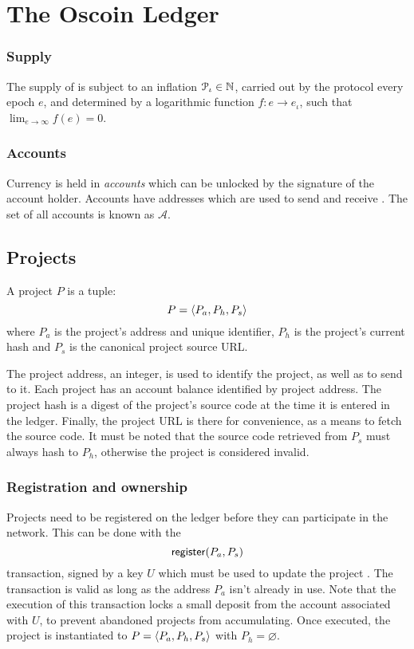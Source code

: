 \section{The Oscoin Ledger}
\label{s:ledger}

\subsubsection{Supply}

The supply of \oscoin{} is subject to an inflation $\mathcal{P}_{\iota} \in
\mathbb{N}$, carried out by the protocol every epoch $e$, and determined by a
logarithmic function $f : e \to e_{\iota}$, such that $\lim_{e \to \infty} f(e)
= 0$.

\subsubsection{Accounts}
\label{s:accounts}

Currency is held in \emph{accounts} which can be unlocked by the signature of
the account holder. Accounts have addresses which are used to send and receive
\oscoin{}. The set of all accounts is known as $\mathcal{A}$.

\subsection{Projects}
\label{s:projects}

A project $P$ is a tuple:
\[
    P = \langle P_a, P_h, P_s\rangle
\]
where $P_{a}$ is the project's address and unique identifier, $P_h$ is
the project's current hash and $P_s$ is the canonical project source
URL.

The project address, an integer, is used to identify the project, as
well as to send \oscoin{} to it. Each project has an account balance
identified by project address. The project hash is a digest of the
project's source code at the time it is entered in the
ledger. Finally, the project URL is there for convenience, as a means
to fetch the source code.  It must be noted that the source code
retrieved from $P_s$ must always hash to $P_h$, otherwise the project
is considered invalid.

\subsubsection{Registration and ownership} Projects need to be
registered on the ledger before they can participate in the
network. This can be done with the
\[
    \mathsf{register}\small{\lparen P_a, P_s\rparen}
\]
transaction, signed by a key $U$ which must be used to update the project . The
transaction is valid as long as the address $P_a$ isn't already in use. Note
that the execution of this transaction locks a small \oscoin{} deposit
from the account associated with $U$, to prevent abandoned projects from
accumulating. Once executed, the project is instantiated to
$P = \langle P_a, P_h, P_s\rangle$ with $P_h = \varnothing$.


